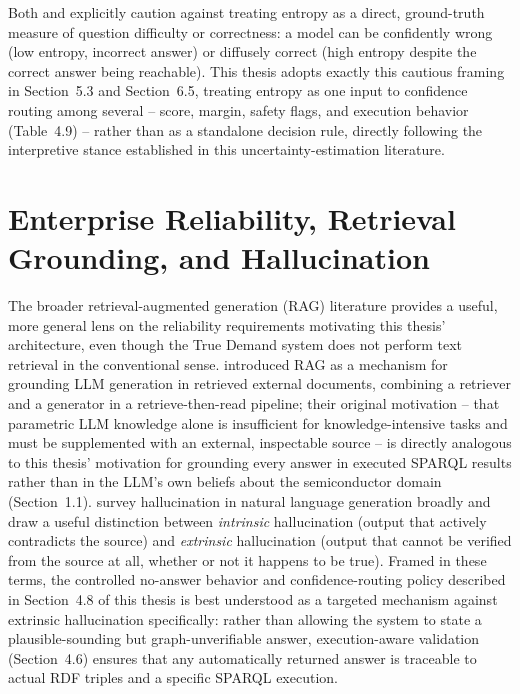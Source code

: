 \documentclass[
  12pt,
  english,
  oneside]{report}
\begin{document}
Both \citet{kuhn2023semantic} and \citet{farquhar2024detecting} explicitly
caution against treating entropy as a direct, ground-truth measure of
question difficulty or correctness: a model can be confidently wrong (low
entropy, incorrect answer) or diffusely correct (high entropy despite the
correct answer being reachable). This thesis adopts exactly this cautious
framing in Section~5.3 and Section~6.5, treating entropy as one input to
confidence routing among several -- score, margin, safety flags, and
execution behavior (Table~4.9) -- rather than as a standalone decision
rule, directly following the interpretive stance established in this
uncertainty-estimation literature.

\section{Enterprise Reliability, Retrieval Grounding, and Hallucination}
\label{sec:reliability-detailed}

The broader retrieval-augmented generation (RAG) literature provides a
useful, more general lens on the reliability requirements motivating this
thesis' architecture, even though the True Demand system does not perform
text retrieval in the conventional sense. \citet{lewis2020retrieval}
introduced RAG as a mechanism for grounding LLM generation in retrieved
external documents, combining a retriever and a generator in a
retrieve-then-read pipeline; their original motivation -- that parametric
LLM knowledge alone is insufficient for knowledge-intensive tasks and must
be supplemented with an external, inspectable source -- is directly
analogous to this thesis' motivation for grounding every answer in
executed SPARQL results rather than in the LLM's own beliefs about the
semiconductor domain (Section~1.1). \citet{ji2023survey} survey
hallucination in natural language generation broadly and draw a useful
distinction between \emph{intrinsic} hallucination (output that actively
contradicts the source) and \emph{extrinsic} hallucination (output that
cannot be verified from the source at all, whether or not it happens to be
true). Framed in these terms, the controlled no-answer behavior and
confidence-routing policy described in Section~4.8 of this thesis is best
understood as a targeted mechanism against extrinsic hallucination
specifically: rather than allowing the system to state a plausible-sounding
but graph-unverifiable answer, execution-aware validation (Section~4.6)
ensures that any automatically returned answer is traceable to actual
RDF triples and a specific SPARQL execution.
\end{document}
